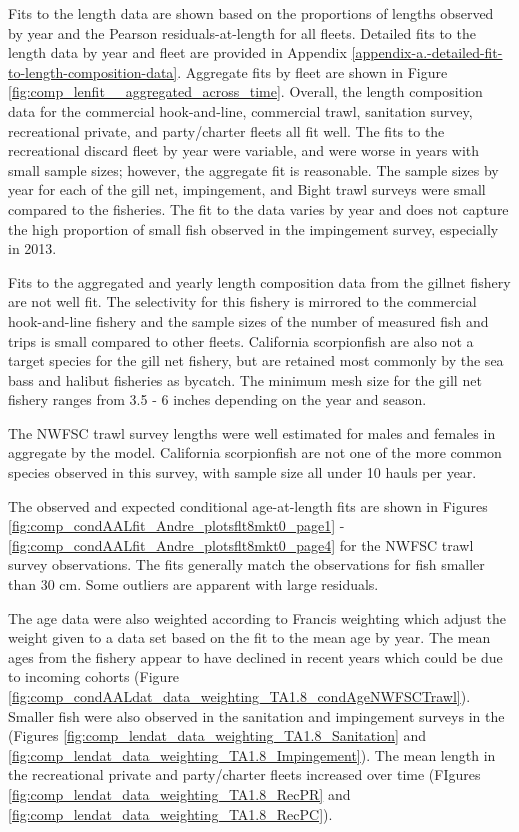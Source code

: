 \documentclass[12pt,]{article}
\begin{document}
Fits to the length data are shown based on the proportions of lengths
observed by year and the Pearson residuals-at-length for all fleets.
Detailed fits to the length data by year and fleet are provided in
Appendix \ref{appendix-a.-detailed-fit-to-length-composition-data}.
Aggregate fits by fleet are shown in Figure
\ref{fig:comp_lenfit__aggregated_across_time}. Overall, the length
composition data for the commercial hook-and-line, commercial trawl,
sanitation survey, recreational private, and party/charter fleets all
fit well. The fits to the recreational discard fleet by year were
variable, and were worse in years with small sample sizes; however, the
aggregate fit is reasonable. The sample sizes by year for each of the
gill net, impingement, and Bight trawl surveys were small compared to
the fisheries. The fit to the data varies by year and does not capture
the high proportion of small fish observed in the impingement survey,
especially in 2013.

Fits to the aggregated and yearly length composition data from the
gillnet fishery are not well fit. The selectivity for this fishery is
mirrored to the commercial hook-and-line fishery and the sample sizes of
the number of measured fish and trips is small compared to other fleets.
California scorpionfish are also not a target species for the gill net
fishery, but are retained most commonly by the sea bass and halibut
fisheries as bycatch. The minimum mesh size for the gill net fishery
ranges from 3.5 - 6 inches depending on the year and season.

The NWFSC trawl survey lengths were well estimated for males and females
in aggregate by the model. California scorpionfish are not one of the
more common species observed in this survey, with sample size all under
10 hauls per year.

The observed and expected conditional age-at-length fits are shown in
Figures \ref{fig:comp_condAALfit_Andre_plotsflt8mkt0_page1} -
\ref{fig:comp_condAALfit_Andre_plotsflt8mkt0_page4} for the NWFSC trawl
survey observations. The fits generally match the observations for fish
smaller than 30 cm. Some outliers are apparent with large residuals.

The age data were also weighted according to Francis weighting which
adjust the weight given to a data set based on the fit to the mean age
by year. The mean ages from the fishery appear to have declined in
recent years which could be due to incoming cohorts (Figure
\ref{fig:comp_condAALdat_data_weighting_TA1.8_condAgeNWFSCTrawl}).\\
Smaller fish were also observed in the sanitation and impingement
surveys in the (Figures
\ref{fig:comp_lendat_data_weighting_TA1.8_Sanitation} and
\ref{fig:comp_lendat_data_weighting_TA1.8_Impingement}). The mean length
in the recreational private and party/charter fleets increased over time
(FIgures \ref{fig:comp_lendat_data_weighting_TA1.8_RecPR} and
\ref{fig:comp_lendat_data_weighting_TA1.8_RecPC}).
\end{document}
